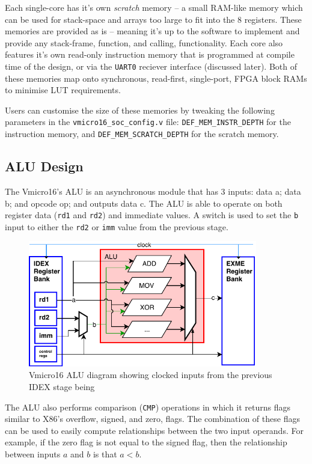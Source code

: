 Each single-core has it's own \textit{scratch} memory -- a small RAM-like memory which can be used for stack-space and arrays too large to fit into the 8 registers. These memories are provided as is -- meaning it's up to the software to implement and provide any stack-frame, function, and calling, functionality.
Each core also features it's own read-only instruction memory that is programmed at compile time of the design, or via the \verb|UART0| reciever interface (discussed later). Both of these memories map onto synchronous, read-first, single-port, FPGA block RAMs to minimise LUT requirements.

Users can customise the size of these memories by tweaking the following parameters in the \verb|vmicro16_soc_config.v| file: \verb|DEF_MEM_INSTR_DEPTH| for the instruction memory, and \verb|DEF_MEM_SCRATCH_DEPTH| for the scratch memory.


\subsection{ALU Design}
The Vmicro16's ALU is an asynchronous module that has 3 inputs: data a; data b; and opcode op; and outputs data c.
The ALU is able to operate on both register data (\verb|rd1| and \verb|rd2|) and immediate values. A switch is used to set the \verb|b| input to either the \verb|rd2| or \verb|imm| value from the previous stage.

\begin{figure}[H]
\centering 
\includegraphics[width=10cm]{../img/alu}
\caption{Vmicro16 ALU diagram showing clocked inputs from the previous IDEX stage being }
\label{fig:alu}
\end{figure}

The ALU also performs comparison (\verb|CMP|) operations in which it returns flags similar to X86's overflow, signed, and zero, flags. The combination of these flags can be used to easily compute relationships between the two input operands. For example, if the zero flag is not equal to the signed flag, then the relationship between inputs $a$ and $b$ is that $a < b$.


